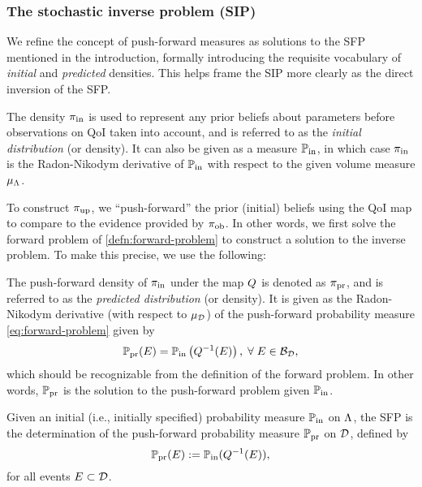 \subsubsection{The stochastic inverse problem (SIP)}

We refine the concept of push-forward measures as solutions to the SFP mentioned in the introduction, formally introducing the requisite vocabulary of \emph{initial} and \emph{predicted} densities.
This helps frame the SIP more clearly as the direct inversion of the SFP.


\begin{defn}\label{defn:initial}
  The density $\operatorname*{\pi_{in}}$ is used to represent any prior beliefs about parameters before observations on QoI taken into account, and is referred to as the \emph{initial distribution} (or density).
  It can also be given as a measure $\operatorname*{\mathbb{P}_{in}}$, in which case $\operatorname*{\pi_{in}}$ is the Radon-Nikodym derivative of $\operatorname*{\mathbb{P}_{in}}$ with respect to the given volume measure $\mu_{{\Lambda}}$.
\end{defn}

To construct $\operatorname*{\pi_{up}}$, we ``push-forward'' the prior (initial) beliefs using the QoI map to compare to the evidence provided by $\operatorname*{\pi_{ob}}$.
In other words, we first solve the forward problem of \eqref{defn:forward-problem} to construct a solution to the inverse problem.
To make this precise, we use the following:

\begin{defn}\label{defn:predicted}
  The push-forward density of $\operatorname*{\pi_{in}}$ under the map $Q$ is denoted as $\operatorname*{\pi_{pr}}$, and is referred to as the \emph{predicted distribution} (or density).
  It is given as the Radon-Nikodym derivative (with respect to $\mu_{\mathcal{D}}$) of the push-forward probability measure \eqref{eq:forward-problem} given by
  \begin{equation}\label{eq:predicted}
    \operatorname*{\mathbb{P}_{pr}} (E) = \operatorname*{\mathbb{P}_{in}} \left ( Q^{-1}(E) \right ), \; \forall \; E \in \mathcal{B}_{\mathcal{D}},
  \end{equation}
  which should be recognizable from the definition of the forward problem.
  In other words, $\operatorname*{\mathbb{P}_{pr}}$ is the solution to the push-forward problem given $\operatorname*{\mathbb{P}_{in}}$.
\end{defn}


\begin{definition}\label{def:forward-problem}
  Given an initial (i.e., initially specified) probability measure $\operatorname*{\mathbb{P}_{in}}$ on ${\Lambda}$, the SFP is the determination of the push-forward probability measure $\operatorname*{\mathbb{P}_{pr}}$ on $\mathcal{D}$, defined by
\begin{equation*}
\operatorname*{\mathbb{P}_{pr}}(E) := \operatorname*{\mathbb{P}_{in}}(Q^{-1}(E)),
\end{equation*}
for all events $E\subset\mathcal{D}$.
\end{definition}

